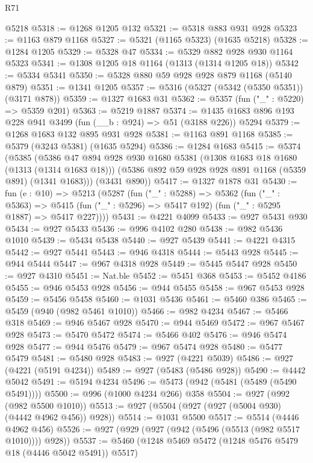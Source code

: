 \begin{lexlean}{R71}
\begin{coremodule}
    @5218
@5318 := @1268 @1205 @132
@5321 := @5318 @883 @931 @928
@5323 := @1163 @879 @1168
@5327 := @5321 (@1165 @5323) (@1635 @5218)
@5328 := @1284 @1205
@5329 := @5328 @47
@5334 := @5329 @882 @928 @930 @1164 @5323
@5341 := @1308 @1205 @18 @1164 (@1313 (@1314 @1205 @18))
@5342 := @5334 @5341
@5350 := @5328 @880 @59 @928 @928 @879 @1168 (@5140 @879)
@5351 := @1341 @1205
@5357 := @5316 (@5327 (@5342 (@5350 @5351)) (@3171 @878))
@5359 := @1327 @1683 @31
@5362 := @5357 (fun ("_" : @5220) => @5359 @201)
@5363 := @5219 @1887
@5374 := @1435 @1683 @896 @193 @228 @941 @3499 (fun (__b : @924) => @51 (@3188 @226)) @5294
@5379 := @1268 @1683 @132 @895 @931 @928
@5381 := @1163 @891 @1168
@5385 := @5379 (@3243 @5381) (@1635 @5294)
@5386 := @1284 @1683
@5415 := @5374
    (@5385
      (@5386
        @47
        @894
        @928
        @930
        @1680
        @5381
        (@1308 @1683 @18 @1680 (@1313 (@1314 @1683 @18)))
        (@5386 @892 @59 @928 @928 @891 @1168 (@5359 @891) (@1341 @1683)))
      (@3431 @890))
@5417 := @1327 @1878 @31
@5430 := fun (e : @10) =>
  @5213
    (@5287
      (fun ("_" : @5288) =>
      @5362
        (fun ("_" : @5363) =>
        @5415 (fun ("_" : @5296) => @5417 @192) (fun ("_" : @5295 @1887) => @5417 @227))))
@5431 := @4221 @4099
@5433 := @927 @5431 @930
@5434 := @927 @5433
@5436 := @996 @4102 @280
@5438 := @982 @5436 @1010
@5439 := @5434 @5438
@5440 := @927 @5439
@5441 := @4221 @4315
@5442 := @927 @5441
@5443 := @946 @4318
@5444 := @5443 @928
@5445 := @944 @5444
@5447 := @967 @4318 @928
@5449 := @5445 @5447 @928
@5450 := @927 @4310
@5451 := Nat.ble
@5452 := @5451 @368
@5453 := @5452 @4186
@5455 := @946 @5453 @928
@5456 := @944 @5455
@5458 := @967 @5453 @928
@5459 := @5456 @5458
@5460 := @1031 @5436
@5461 := @5460 @386
@5465 := @5459 (@940 (@982 @5461 @1010))
@5466 := @982 @4234
@5467 := @5466 @318
@5469 := @946 @5467 @928
@5470 := @944 @5469
@5472 := @967 @5467 @928
@5473 := @5470 @5472
@5474 := @5466 @402
@5476 := @946 @5474 @928
@5477 := @944 @5476
@5479 := @967 @5474 @928
@5480 := @5477 @5479
@5481 := @5480 @928
@5483 := @927 (@4221 @5039)
@5486 := @927 (@4221 (@5191 @4234))
@5489 := @927 (@5483 (@5486 @928))
@5490 := @4442 @5042
@5491 := @5194 @4234
@5496 := @5473 (@942 (@5481 (@5489 (@5490 @5491))))
@5500 := @996 (@1000 @4234 @266) @358
@5504 := @927 (@992 (@982 @5500 @1010))
@5513 := @927 (@5504 (@927 (@927 (@5004 @930) (@4442 @4962 @456)) @928))
@5514 := @1031 @5500
@5517 := @5514 (@4446 @4962 @456)
@5526 := @927 (@929 (@927 (@942 (@5496 (@5513 (@982 @5517 @1010)))) @928))
@5537 := @5460 (@1248 @5469 @5472 (@1248 @5476 @5479 @18 (@4446 @5042 @5491)) @5517)

\end{coremodule}
\end{lexlean}
